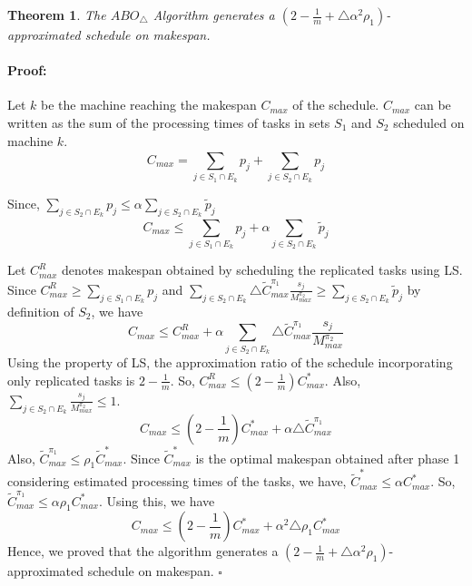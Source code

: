 \documentclass[12pt]{article}
\theoremstyle{mystyle}
\newtheorem{theorem}{Theorem}
\newenvironment{myproof}{\paragraph{Proof:}}{\hfill$\square$}
\begin{document}
           \begin{theorem}
           \label{th:chapter5-la}
            The $ABO_\triangle$ Algorithm  generates a $ (2-\frac{1}{m}+\triangle\alpha^2 \rho_1) $- approximated schedule on makespan.
           \end{theorem}         
           \begin{myproof}
           Let $k$ be the machine reaching the makespan $C_{max}$ of the schedule. $C_{max}$ can be written as the sum of the processing times of tasks in sets $S_1$ and $S_2$ scheduled on machine $k$.
           \begin{equation}\nonumber
     C_{max}= \sum_{j \in S_1 \cap E_k}^{}p_j+\sum_{j \in S_2 \cap E_k}^{}p_j 
           \end{equation}
           
           Since, $\sum\limits
           _{j \in S_2 \cap E_k}^{}p_j\leq\alpha\sum\limits
           _{j \in S_2 \cap E_k} \tilde{p}_j$
             \begin{equation}\nonumber
             C_{max} \leq \sum_{j \in S_1 \cap E_k}^{}p_j+\alpha\sum_{j \in S_2 \cap E_k} \tilde{p}_j 
                   \end{equation}
          
           
           Let $C^R_{max}$ denotes makespan obtained by scheduling the replicated tasks using LS. Since $C^R_{max} \geq \sum\limits
           _{j \in S_1 \cap E_k}^{}p_j$ and $\sum\limits
           _{j \in S_2\cap E_k}\triangle {\tilde{C}^{\pi_1}_{max}} \frac{s_j}{M^{\pi_2}_{max}}\geq \sum\limits
           _{j \in S_2\cap E_k}^{}\tilde{p}_j $ by definition of $S_2$, we have
           \begin{equation}\nonumber
            C_{max}\leq C^R_{max}+\alpha\sum_{j \in S_2\cap E_k}^{}\triangle {\tilde{C}^{\pi_1}_{max}} \frac{s_j}{M^{\pi_2}_{max}}
                  \end{equation}
            Using the property of LS, the approximation ratio of the schedule incorporating only replicated tasks is $2-\frac{1}{m}$. So, $C^R_{max} \leq (2-\frac{1}{m})C^{*}_{max}$. Also, $\sum\limits
            _{j\in S_2\cap E_k}^{} \frac{s_j}{M^{\pi_2}_{max}}\leq 1$. 
            \begin{equation}\nonumber
                    C_{max}\leq (2-\frac{1}{m})C^{*}_{max}+\alpha\triangle {\tilde{C}^{\pi_1}_{max}} 
                          \end{equation}
               Also,  ${\tilde{C}^{\pi_1}_{max}} \leq \rho_1 {\tilde{C}^{*}_{max}}$. Since $\tilde{C}^{*}_{max}$ is the optimal makespan obtained after phase 1 considering estimated processing times of the tasks, we have, $\tilde{C}^{*}_{max}\leq \alpha{C}^{*}_{max}$. So, ${\tilde{C}^{\pi_1}_{max}} \leq \alpha \rho_1{C}^{*}_{max}$. Using this, we have         
              \begin{equation}\nonumber
                            C_{max}\leq (2-\frac{1}{m}){{C}^{*}_{max}}+\alpha^2\triangle \rho_1 {{C}^{*}_{max}} 
                                  \end{equation}
               Hence, we proved that the algorithm generates a $(2-\frac{1}{m}+\triangle \alpha^2\rho_1) $- approximated schedule on makespan.
               \end{myproof}
\end{document}
